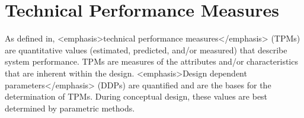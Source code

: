 \section{Technical Performance Measures}

As defined in, <emphasis>technical performance measures</emphasis> (TPMs) are quantitative values (estimated, predicted, and/or measured) that describe system performance. TPMs are measures of the attributes and/or characteristics that are inherent within the design. <emphasis>Design dependent parameters</emphasis> (DDPs) are quantified and are the bases for the determination of TPMs. During conceptual design, these values are best determined by parametric methods.